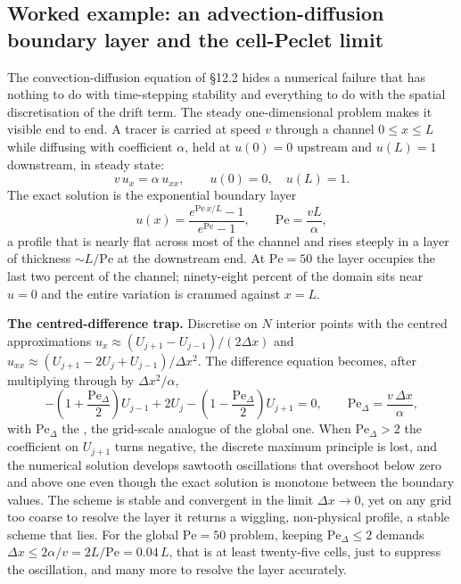 \subsection{Worked example: an advection-diffusion boundary layer and the cell-Peclet limit}

The convection-diffusion equation of §12.2 hides a numerical
failure that has nothing to do with time-stepping stability and
everything to do with the spatial discretisation of the drift term.
The steady one-dimensional problem makes it visible end to end.
A tracer is carried at speed $v$ through a channel $0 \leq x \leq L$
while diffusing with coefficient $\alpha$, held at $u(0) = 0$
upstream and $u(L) = 1$ downstream, in steady state:
\[
v\,u_{x} = \alpha\,u_{xx}, \qquad u(0) = 0, \quad u(L) = 1.
\]
The exact solution is the exponential boundary layer
\[
u(x) = \frac{e^{\mathrm{Pe}\,x/L} - 1}{e^{\mathrm{Pe}} - 1},
\qquad \mathrm{Pe} = \frac{vL}{\alpha},
\]
a profile that is nearly flat across most of the channel and rises
steeply in a layer of thickness $\sim L/\mathrm{Pe}$ at the
downstream end. At $\mathrm{Pe} = 50$ the layer occupies the last
two percent of the channel; ninety-eight percent of the domain sits
near $u = 0$ and the entire variation is crammed against
$x = L$.

\textbf{The centred-difference trap.} Discretise on $N$ interior
points with the centred approximations $u_{x} \approx (U_{j+1} -
U_{j-1})/(2\Delta x)$ and $u_{xx} \approx (U_{j+1} - 2U_{j} +
U_{j-1})/\Delta x^{2}$. The difference equation becomes, after
multiplying through by $\Delta x^{2}/\alpha$,
\[
-\left(1 + \frac{\mathrm{Pe}_{\Delta}}{2}\right)U_{j-1}
+ 2U_{j}
-\left(1 - \frac{\mathrm{Pe}_{\Delta}}{2}\right)U_{j+1} = 0,
\qquad \mathrm{Pe}_{\Delta} = \frac{v\,\Delta x}{\alpha},
\]
with $\mathrm{Pe}_{\Delta}$ the , the
grid-scale analogue of the global one. When $\mathrm{Pe}_{\Delta} >
2$ the coefficient on $U_{j+1}$ turns negative, the discrete maximum
principle is lost, and the numerical solution develops sawtooth
oscillations that overshoot below zero and above one even though the
exact solution is monotone between the boundary values. The scheme
is stable and convergent in the limit $\Delta x \to 0$, yet on any
grid too coarse to resolve the layer it returns a wiggling,
non-physical profile, a stable scheme that lies. For the global
$\mathrm{Pe} = 50$ problem, keeping $\mathrm{Pe}_{\Delta} \leq 2$
demands $\Delta x \leq 2\alpha/v = 2L/\mathrm{Pe} = 0.04\,L$, that
is at least twenty-five cells, just to suppress the oscillation,
and many more to resolve the layer accurately.

